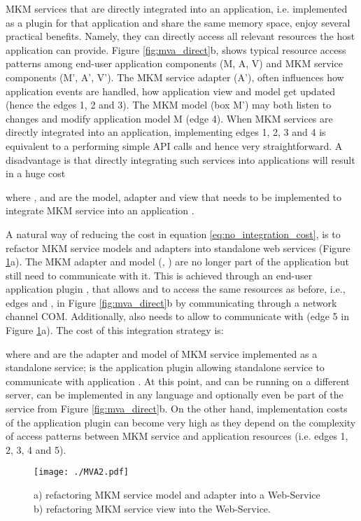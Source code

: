 \documentclass{llncs}
\begin{document}
MKM services that are directly integrated into an application, i.e. implemented as a plugin for that application and share the same memory space, enjoy several practical benefits. Namely, they can directly access all relevant resources the host application can provide. Figure \ref{fig:mva_direct}b, shows typical resource access patterns among end-user application components (M, A, V) and MKM service components (M', A', V'). The MKM service adapter (A'), often influences how application events are handled, how application view and model get updated (hence the edges 1, 2 and 3). The MKM model (box M') may both listen to changes and modify application model M (edge 4). When MKM services are directly integrated into an application, implementing edges 1, 2, 3 and 4 is equivalent to a performing simple API calls and hence very straightforward. A disadvantage is that directly integrating  such services into  applications will result in a huge cost 

where ,  and  are the model, adapter and view that needs to be implemented to integrate MKM service  into an application . 

A natural way of reducing the cost in equation \ref{eq:no_integration_cost}, is to refactor MKM service models and adapters into standalone web services (Figure \ref{fig:integration_ws}a). The MKM adapter and model (, ) are no longer part of the application but still need to communicate with it. This is achieved through an end-user application plugin , that allows  and  to access the same resources as before, i.e., edges  and , in Figure \ref{fig:mva_direct}b by communicating through a network channel COM. Additionally,  also needs to allow  to communicate with  (edge 5 in Figure \ref{fig:integration_ws}a). The cost of this integration strategy is:

where  and  are the adapter and model of MKM service  implemented as a standalone service;  is the application plugin allowing standalone service  to communicate with application . At this point,  and  can be running on a different server, can be implemented in any language and optionally even be part of the service  from Figure \ref{fig:mva_direct}b. On the other hand, implementation costs of the application plugin  can become very high as they depend on the complexity of access patterns between MKM service and application resources (i.e. edges 1, 2, 3, 4 and 5).

\begin{figure}
\centering
\texttt{[image: ./MVA2.pdf]}
\caption{a) refactoring MKM service model and adapter into a Web-Service b) refactoring MKM service view into the Web-Service. }
\label{fig:integration_ws}
\end{figure}
\end{document}
